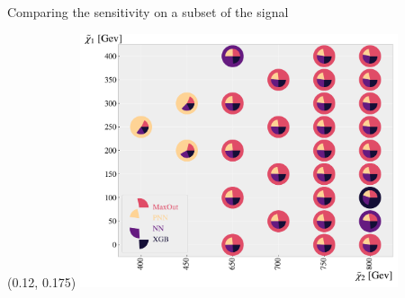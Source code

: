 \documentclass[UKenglish]{beamer}
\begin{document}

\begin{frame}{Comparing the sensitivity on a subset of the signal}
    \begin{textblock}{1}(0.12, 0.175)
    \includegraphics[width=0.7\textwidth]{figures/Comps/GenPlussXGBNetworkComp.pdf}
    \end{textblock}
\end{frame}
\end{document}
